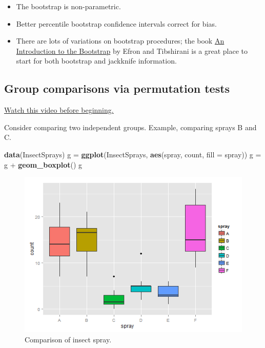 \documentclass[]{article}
\newenvironment{Shaded}{\begin{snugshade}}{\end{snugshade}}
\newcommand{\KeywordTok}[1]{\textcolor[rgb]{0.13,0.29,0.53}{\textbf{{#1}}}}
\newcommand{\DataTypeTok}[1]{\textcolor[rgb]{0.13,0.29,0.53}{{#1}}}
\newcommand{\StringTok}[1]{\textcolor[rgb]{0.31,0.60,0.02}{{#1}}}
\newcommand{\NormalTok}[1]{{#1}}
\begin{document}
\begin{itemize}
\itemsep1pt\parskip0pt
\item
  The bootstrap is non-parametric.
\item
  Better percentile bootstrap confidence intervals correct for bias.
\item
  There are lots of variations on bootstrap procedures; the book
  \href{http://www.crcpress.com/product/isbn/9780412042317}{An
  Introduction to the Bootstrap} by Efron and Tibshirani is a great
  place to start for both bootstrap and jackknife information.
\end{itemize}

\subsection{Group comparisons via permutation
tests}\label{group-comparisons-via-permutation-tests}

\href{http://youtu.be/nn1t9Kk7nn8?list=PLpl-gQkQivXiBmGyzLrUjzsblmQsLtkzJ}{Watch
this video before beginning.}

Consider comparing two independent groups. Example, comparing sprays B
and C.

\begin{Shaded}
\begin{Highlighting}[]
\KeywordTok{data}\NormalTok{(InsectSprays)}
\NormalTok{g =}\StringTok{ }\KeywordTok{ggplot}\NormalTok{(InsectSprays, }\KeywordTok{aes}\NormalTok{(spray, count, }\DataTypeTok{fill =} \NormalTok{spray))}
\NormalTok{g =}\StringTok{ }\NormalTok{g +}\StringTok{ }\KeywordTok{geom_boxplot}\NormalTok{()}
\NormalTok{g}
\end{Highlighting}
\end{Shaded}

\begin{figure}[htbp]
\centering
\includegraphics{LeanPub/images/bootstrapping5-1.png}
\caption{Comparison of insect spray.}
\end{figure}
\end{document}
